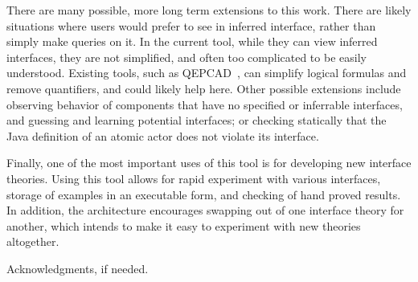 \documentclass[preprint,11pt]{sigplanconf}
\begin{document}
There are many possible, more long term extensions to this work. There are
likely situations where users would prefer to see in inferred interface,
rather than simply make queries on it.  In the current tool, while they can
view inferred interfaces, they are not simplified, and often too complicated to
be easily understood.  Existing tools, such as QEPCAD~\cite{qepcad}, can
simplify logical formulas and remove quantifiers, and could likely help here.
Other possible extensions include observing behavior of components that have no
specified or inferrable interfaces, and guessing and learning potential
interfaces; or checking statically that the Java definition of an atomic actor
does not violate its interface.

Finally, one of the most important uses of this tool is for developing new
interface theories. Using this tool allows for rapid experiment with various
interfaces, storage of examples in an executable form, and checking of hand
proved results. In addition, the architecture encourages swapping out of one
interface theory for another, which intends to make it easy to experiment with
new theories altogether.

\acks

Acknowledgments, if needed.




\end{document}
